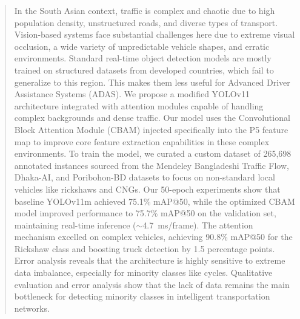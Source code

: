 \documentclass[sigconf]{acmart}
\begin{document}
\begin{abstract}
In the South Asian context, traffic is complex and chaotic due to high population density, unstructured roads, and diverse types of transport. Vision-based systems face substantial challenges here due to extreme visual occlusion, a wide variety of unpredictable vehicle shapes, and erratic environments. Standard real-time object detection models are mostly trained on structured datasets from developed countries, which fail to generalize to this region. This makes them less useful for Advanced Driver Assistance Systems (ADAS). We propose a modified YOLOv11 architecture integrated with attention modules capable of handling complex backgrounds and dense traffic. Our model uses the Convolutional Block Attention Module (CBAM) injected specifically into the P5 feature map to improve core feature extraction capabilities in these complex environments. To train the model, we curated a custom dataset of 265,698 annotated instances sourced from the Mendeley Bangladeshi Traffic Flow, Dhaka-AI, and Poribohon-BD datasets to focus on non-standard local vehicles like rickshaws and CNGs. Our 50-epoch experiments show that baseline YOLOv11m achieved 75.1\% mAP@50, while the optimized CBAM model improved performance to 75.7\% mAP@50 on the validation set, maintaining real-time inference ($\sim$4.7~ms/frame). The attention mechanism excelled on complex vehicles, achieving 90.8\% mAP@50 for the Rickshaw class and boosting truck detection by 1.5 percentage points. Error analysis reveals that the architecture is highly sensitive to extreme data imbalance, especially for minority classes like cycles. Qualitative evaluation and error analysis show that the lack of data remains the main bottleneck for detecting minority classes in intelligent transportation networks.
\end{abstract}

\end{document}
